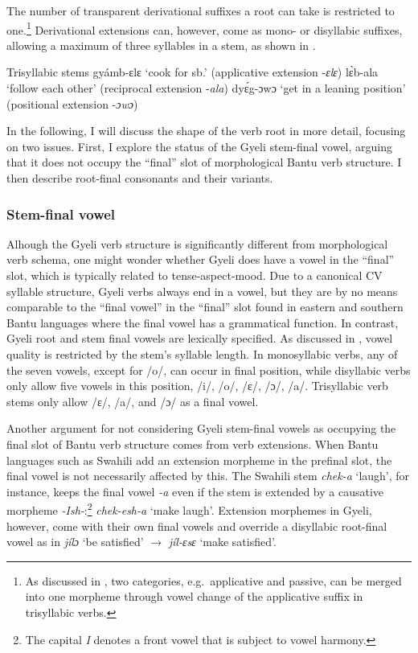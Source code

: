 The number of transparent derivational suffixes a root can take is restricted to one.\footnote{As discussed in , two categories, e.g.\ applicative and passive, can be merged into one morpheme through vowel change of the applicative suffix in trisyllabic verbs.} Derivational extensions can, however, come as mono- or disyllabic suffixes, allowing a maximum of three syllables in a stem, as shown in .

\ea \label{Vroot4} Trisyllabic stems
  \ea   gyámb-ɛlɛ `cook for sb.' (applicative extension -{\itshape ɛlɛ})
\ex lɛ̀b-ala `follow each other' (reciprocal extension -{\itshape ala})
\ex dyɛ́g-ɔwɔ `get in a leaning position' (positional extension -{\itshape ɔwɔ})
\z
\z

In the following, I will discuss the shape of the verb root in more detail, focusing on two issues. First, I explore the status of the Gyeli stem-final vowel, arguing that it does not occupy the ``final'' slot of  morphological Bantu verb structure. I then describe root-final consonants and their variants.




\subsubsection{Stem-final vowel} 
\label{sec:StemFinalV}
\largerpage

Alhough the Gyeli verb structure is significantly different from  morphological verb schema, one might wonder whether Gyeli does have a vowel in the ``final'' slot, which is typically related to tense-aspect-mood.
Due to a canonical CV syllable structure, Gyeli verbs always end in a vowel, but they are by no means comparable to the ``final vowel'' in the ``final'' slot found in eastern and southern Bantu languages where the final vowel has a grammatical function. In contrast, Gyeli root and stem final vowels are lexically specified.  As discussed in , vowel quality is restricted by the stem's syllable length. In monosyllabic verbs, any of the seven vowels, except for /o/, can occur in final position, while disyllabic verbs only allow five vowels in this position, /i/, /o/, /ɛ/, /ɔ/, /a/. Trisyllabic verb stems only allow /ɛ/, /a/, and /ɔ/ as a final vowel.

Another argument for not considering Gyeli stem-final vowels as occupying the final slot of  Bantu verb structure comes from verb extensions. When Bantu languages such as Swahili add an extension morpheme in the prefinal slot, the final vowel is not necessarily affected by this. The Swahili stem {\itshape chek-a} `laugh', for instance, keeps the final vowel {\itshape -a} even if the stem is extended by a causative morpheme {\itshape -Ish-}:\footnote{The capital {\itshape I} denotes a front vowel that is subject to vowel harmony.} {\itshape chek-esh-a} `make laugh'. Extension morphemes in Gyeli, however, come with their own final vowels and override a disyllabic root-final vowel  as in {\itshape jílɔ} `be satisfied' $\rightarrow$ {\itshape jíl-ɛsɛ} `make satisfied'.

